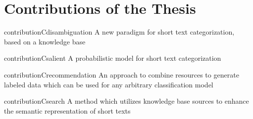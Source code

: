 \section{Contributions of the Thesis}

\begin{restatable}{contribution}{Cdisambiguation} \label{c:disambiguation}
A new paradigm for short text categorization, based on a knowledge base
\end{restatable}
\vspace{-0.9em}
\noindent 

\begin{restatable}{contribution}{Csalient} \label{c:salient}
A probabilistic model for short text categorization
\end{restatable}
\vspace{-0.9em}

\begin{restatable}{contribution}{Crecommendation} \label{c:recommendation}
An approach to combine resources to generate labeled data which can be used for any arbitrary classification model
\end{restatable}
\vspace{-0.9em}

\begin{restatable}{contribution}{Csearch} \label{c:search}
A method which utilizes knowledge base sources to enhance the semantic representation of short texts  
\end{restatable}
\vspace{-0.9em}

